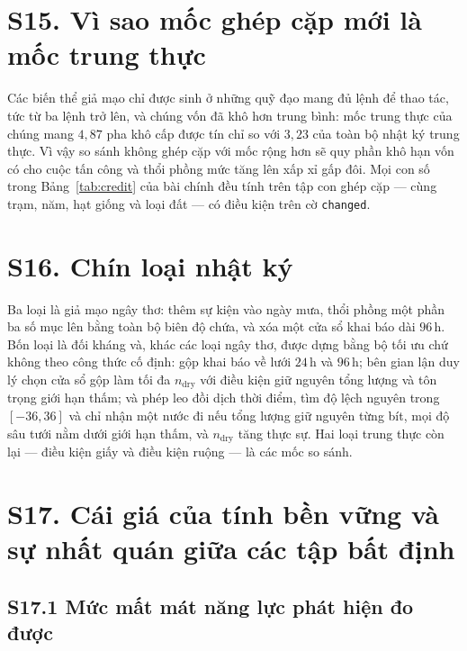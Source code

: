 \section*{S15. Vì sao mốc ghép cặp mới là mốc trung thực}

Các biến thể giả mạo chỉ được sinh ở những quỹ đạo mang đủ lệnh để thao tác, tức từ ba lệnh
trở lên, và chúng vốn đã khô hơn trung bình: mốc trung thực của chúng mang $4{,}87$ pha khô
cấp được tín chỉ so với $3{,}23$ của toàn bộ nhật ký trung thực. Vì vậy so sánh không ghép cặp
với mốc rộng hơn sẽ quy phần khô hạn vốn có cho cuộc tấn công và thổi phồng mức tăng lên xấp xỉ
gấp đôi. Mọi con số trong Bảng~\ref{tab:credit} của bài chính đều tính trên tập con ghép cặp
--- cùng trạm, năm, hạt giống và loại đất --- có điều kiện trên cờ \texttt{changed}.

\section*{S16. Chín loại nhật ký}

Ba loại là giả mạo ngây thơ: thêm sự kiện vào ngày mưa, thổi phồng một phần ba số mục lên bằng
toàn bộ biên độ chứa, và xóa một cửa sổ khai báo dài $96$\,h. Bốn loại là đối kháng và, khác các
loại ngây thơ, được dựng bằng bộ tối ưu chứ không theo công thức cố định: gộp khai báo về lưới
$24$\,h và $96$\,h; bên gian lận duy lý chọn cửa sổ gộp làm tối đa $n_{\mathrm{dry}}$ với điều kiện
giữ nguyên tổng lượng và tôn trọng giới hạn thấm; và phép leo đồi dịch thời điểm, tìm độ lệch
nguyên trong $[-36,36]$ và chỉ nhận một nước đi nếu tổng lượng giữ nguyên từng bít, mọi độ sâu
tưới nằm dưới giới hạn thấm, và $n_{\mathrm{dry}}$ tăng thực sự. Hai loại trung thực còn lại --- điều
kiện giấy và điều kiện ruộng --- là các mốc so sánh.

\section*{S17. Cái giá của tính bền vững và sự nhất quán giữa các tập bất định}

\subsection*{S17.1 Mức mất mát năng lực phát hiện đo được}

